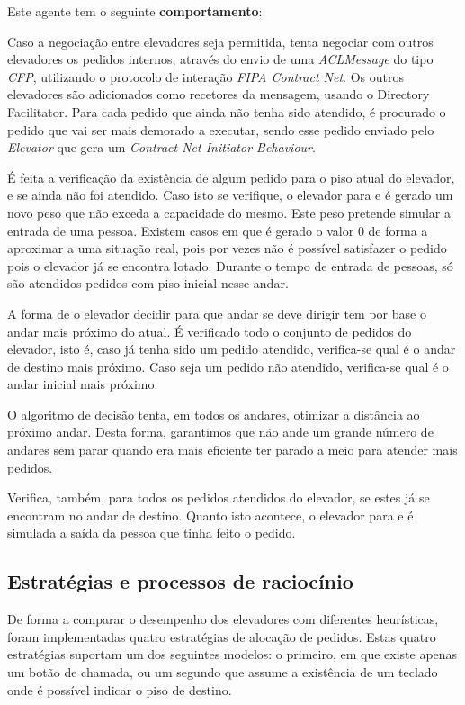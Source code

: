 \documentclass[a4paper]{article}
\begin{document}
Este agente tem o seguinte \textbf{comportamento}:

Caso a negociação entre elevadores seja permitida, tenta negociar com outros elevadores os pedidos internos, através do envio de uma \textit{ACLMessage} do tipo \textit{CFP}, utilizando o protocolo de interação \textit{FIPA Contract Net}. Os outros elevadores são adicionados como recetores da mensagem, usando o Directory Facilitator. Para cada pedido que ainda não tenha sido atendido, é procurado o pedido que vai ser mais demorado a executar, sendo esse pedido enviado pelo \textit{Elevator} que gera um \textit{Contract Net Initiator Behaviour}.

É feita a verificação da existência de algum pedido para o piso atual do elevador, e se ainda não foi atendido. Caso isto se verifique, o elevador para e é gerado um novo peso que não exceda a capacidade do mesmo. Este peso pretende simular a entrada de uma pessoa. Existem casos em que é gerado o valor 0 de forma a aproximar a uma situação real, pois por vezes não é possível satisfazer o pedido pois o elevador já se encontra lotado. Durante o tempo de entrada de pessoas, só são atendidos pedidos com piso inicial nesse andar.

A forma de o elevador decidir para que andar se deve dirigir tem por base o andar mais próximo do atual. É verificado todo o conjunto de pedidos do elevador, isto é, caso já tenha sido um pedido atendido, verifica-se qual é o andar de destino mais próximo. Caso seja um pedido não atendido, verifica-se qual é o andar inicial mais próximo.

O algoritmo de decisão tenta, em todos os andares, otimizar a distância ao próximo andar. Desta forma, garantimos que não ande um grande número de andares sem parar quando era mais eficiente ter parado a meio para atender mais pedidos.

Verifica, também, para todos os pedidos atendidos do elevador, se estes já se encontram no andar de destino. Quanto isto acontece, o elevador para e é simulada a saída da pessoa que tinha feito o pedido.

\subsection{Estratégias e processos de raciocínio} 

De forma a comparar o desempenho dos elevadores com diferentes heurísticas, foram implementadas quatro estratégias de alocação de pedidos. Estas quatro estratégias suportam um dos seguintes modelos: o primeiro, em que existe apenas um botão de chamada, ou um segundo que assume a existência de um teclado onde é possível indicar o piso de destino.
\end{document}
